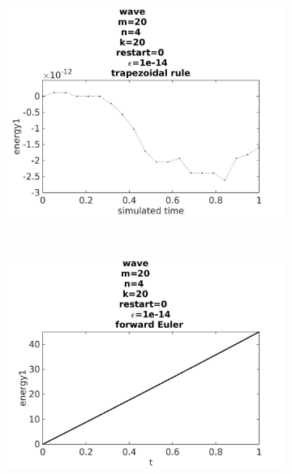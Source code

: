 \begin{figure}[H]
        \centering
        \begin{subfigure}[b]{0.30\textwidth}
                \includegraphics[width=\textwidth]{../MATLAB/fig/energyovertimetrapezoidal.jpg}
                \caption{  }
                \label{fig:errortrap}
        \end{subfigure}%
        ~
        \begin{subfigure}[b]{0.30\textwidth}
                \includegraphics[width=\textwidth]{../MATLAB/fig/energyovertimeeuler.jpg}
                \caption{  }
                \label{fig:erroreul}
        \end{subfigure}
        \begin{subfigure}[b]{0.30\textwidth}

\end{subfigure}
\end{figure}
